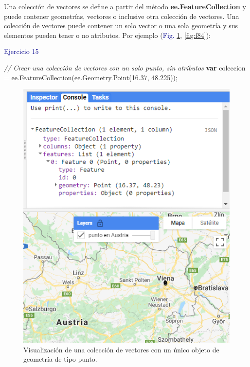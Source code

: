 \documentclass[
  12pt,
  letterpaper,
  twoside]{book}
\newenvironment{Shaded}{\begin{snugshade}}{\end{snugshade}}
\newcommand{\AttributeTok}[1]{\textcolor[rgb]{0.48,0.12,0.64}{#1}}
\newcommand{\CommentTok}[1]{\textcolor[rgb]{0.24,0.58,0.00}{\textit{#1}}}
\newcommand{\ControlFlowTok}[1]{\textcolor[rgb]{0.00,0.00,0.00}{\textbf{#1}}}
\newcommand{\FloatTok}[1]{\textcolor[rgb]{0.28,0.53,0.93}{#1}}
\newcommand{\FunctionTok}[1]{\textcolor[rgb]{0.48,0.12,0.64}{#1}}
\newcommand{\KeywordTok}[1]{\textcolor[rgb]{0.48,0.12,0.64}{#1}}
\newcommand{\NormalTok}[1]{#1}
\newcommand{\OperatorTok}[1]{\textcolor[rgb]{0.00,0.00,0.00}{#1}}
\newcommand\boldpurple[1]{\textcolor{darkpurple}{\textbf{#1}}}
\begin{document}
Una colección de vectores se define a partir del método \boldpurple{ee.FeatureCollection} y puede contener geometrías, vectores o inclusive otra colección de vectores. Una colección de vectores puede contener un solo vector o una sola geometría y sus elementos pueden tener o no atributos. Por ejemplo (\textcolor{darkblue}{Fig.} \ref{fig:f83}, \ref{fig:f84}):

\textcolor{darkblue}{Ejercicio 15}

\begin{Shaded}
\begin{Highlighting}[]
\CommentTok{// Crear una colección de vectores con un solo punto, sin atributos }
\ControlFlowTok{var}\NormalTok{ coleccion }\OperatorTok{=} \KeywordTok{ee}\OperatorTok{.}\FunctionTok{FeatureCollection}\NormalTok{(}\KeywordTok{ee}\OperatorTok{.}\AttributeTok{Geometry}\OperatorTok{.}\FunctionTok{Point}\NormalTok{(}\FloatTok{16.37}\OperatorTok{,} \FloatTok{48.225}\NormalTok{))}\OperatorTok{;}
\end{Highlighting}
\end{Shaded}

\begin{figure}[H]

{\centering \includegraphics[width=0.8\linewidth]{Img/ej15} 

}

\caption{Visualización de una colección de vectores con un único objeto de geometría de tipo punto.}\label{fig:f83}
\end{figure}
\end{document}
